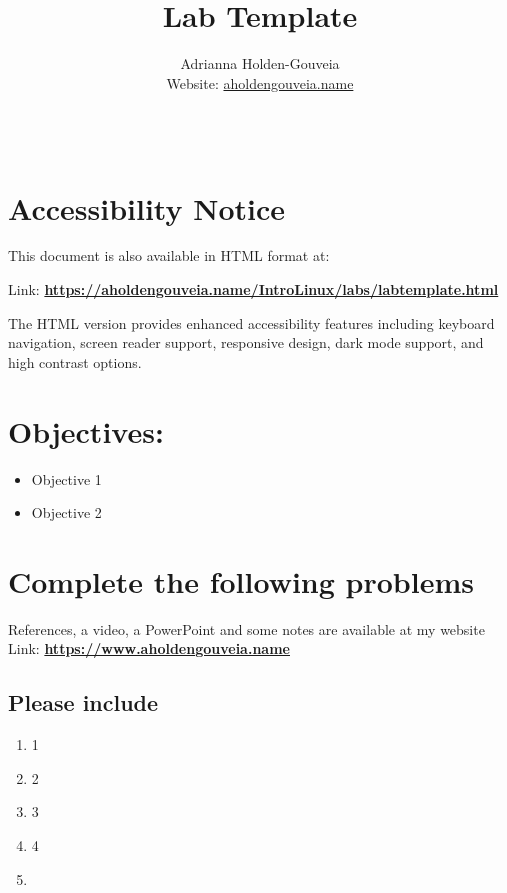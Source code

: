 \documentclass[12pt]{article}
\title{Lab Template}
\author{
        Adrianna Holden-Gouveia \\
        Website: \href{https://aholdengouveia.name}{aholdengouveia.name}\\ 
        \date{\vspace{-5ex}}
        \faGithub {: aholdengouveia} \\
        }
\begin{document}
    

\maketitle

\section*{Accessibility Notice}
This document is also available in HTML format at:

Link: \href{https://aholdengouveia.name/IntroLinux/labs/labtemplate.html}{\textbf{https://aholdengouveia.name/IntroLinux/labs/labtemplate.html}}

The HTML version provides enhanced accessibility features including keyboard navigation, screen reader support, responsive design, dark mode support, and high contrast options.



\section*{Objectives:}
\begin{itemize}
    \item Objective 1
    \item Objective 2
\end{itemize}
\section*{Complete the following problems}

References, a video, a PowerPoint and some notes are available at my website
Link: \href{https://www.aholdengouveia.name}{\textbf{https://www.aholdengouveia.name}}

\subsection*{Please include}
    \begin{enumerate}
        \item 1
        \item 2
        \item 3
        \item 4
        \item 


    \end{enumerate}
\end{document}
